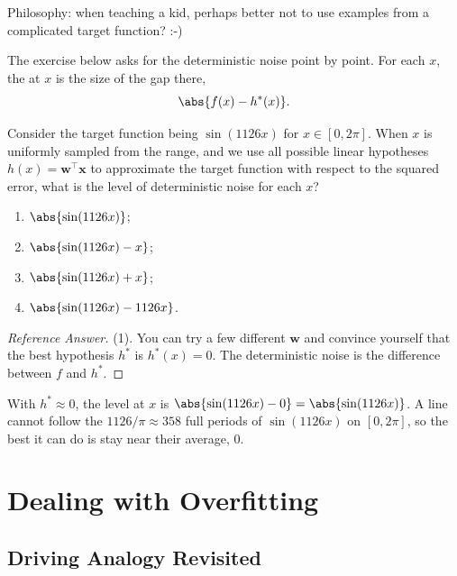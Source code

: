 \begin{moral}
    Philosophy: when teaching a kid, perhaps better not to use examples from a
    complicated target function? :-)
\end{moral}

The exercise below asks for the deterministic noise point by point. For each
\(x\), the  at \(x\) is the size of the gap
there,
\[
    \abs{f(x) - h^*(x)} .
\]

\begin{exercise}
    Consider the target function being \(\sin(1126x)\) for \(x \in [0, 2\pi]\).
    When \(x\) is uniformly sampled from the range, and we use all possible
    linear hypotheses \(h(x) = \bm{w}^\top \bm{x}\) to approximate the target
    function with respect to the squared error, what is the level of
    deterministic noise for each \(x\)?
    \begin{enumerate}[(1)]
        \item \(\abs{\sin(1126x)}\);
        \item \(\abs{\sin(1126x) - x}\);
        \item \(\abs{\sin(1126x) + x}\);
        \item \(\abs{\sin(1126x) - 1126x}\).
    \end{enumerate}
\end{exercise}

\begin{proof}[Reference Answer]
    (1). You can try a few different \(\bm{w}\) and convince yourself that the
    best hypothesis \(h^*\) is \(h^*(x) = 0\). The deterministic noise is the
    difference between \(f\) and \(h^*\).
\end{proof}

With \(h^* \approx 0\), the level at \(x\) is \(\abs{\sin(1126x) - 0} =
\abs{\sin(1126x)}\). A line cannot follow the \(1126/\pi \approx 358\) full periods of
\(\sin(1126x)\) on \([0, 2\pi]\), so the best it can do is stay near their
average, \(0\).

\section{Dealing with Overfitting}\label{sec:deal-overfit}


\subsection{Driving Analogy Revisited}

